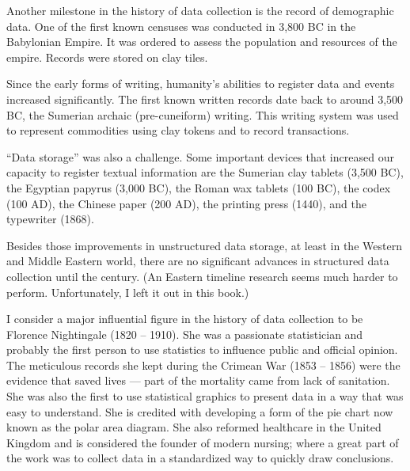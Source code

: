Another milestone in the history of data collection is the record of
demographic data.  One of the first known censuses was conducted in 3,800 BC in the Babylonian
Empire.  It was ordered to assess the population and resources of
the empire.  Records were stored on clay tiles.

Since the early forms of writing, humanity's abilities to register data and events
increased significantly.  The first known written records date back to around 3,500 BC, the
Sumerian archaic (pre-cuneiform) writing.  This writing system was used to represent
commodities using clay tokens and to record transactions.

``Data storage'' was also a challenge.  Some important devices that increased our capacity
to register textual information are the Sumerian clay tablets (3,500 BC), the Egyptian
papyrus (3,000 BC), the Roman wax tablets (100 BC), the codex
(100 AD), the Chinese paper (200 AD), the printing press (1440), and the typewriter (1868).


Besides those improvements in unstructured data storage, at least in the Western and
Middle Eastern world, there are no significant advances in structured data collection
until the  century.  (An Eastern timeline research seems much harder to perform.
Unfortunately, I left it out in this book.)

I consider a major influential figure in the history of data
collection to be Florence Nightingale (1820 -- 1910).  She was a passionate statistician
and probably the first person to use statistics to influence public and official
opinion.  The meticulous records she kept during the Crimean War
(1853 -- 1856) were the evidence that saved lives --- part of the mortality came from lack
of sanitation.  She was also the first to use
statistical graphics to present data in a way that was easy to understand.  She is
credited with developing a form of the pie chart now known as the polar area
diagram.  She also reformed healthcare in the United Kingdom and
is considered the founder of modern nursing; where a great part of the work was to collect
data in a standardized way to quickly draw conclusions.

